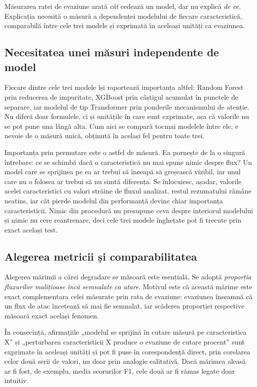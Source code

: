 Măsurarea ratei de evaziune arată \emph{cât} cedează un model, dar nu explică \emph{de ce}. Explicația necesită o măsură a dependenței modelului de fiecare caracteristică, comparabilă între cele trei modele și exprimată în aceleași unități ca evaziunea.

\subsection{Necesitatea unei măsuri independente de model}\label{subsec:agnostic}

Fiecare dintre cele trei modele își raportează importanța altfel: Random Forest prin reducerea de impuritate, XGBoost prin câștigul acumulat în punctele de separare, iar modelul de tip Transformer prin ponderile mecanismului de atenție. Nu diferă doar formulele, ci și unitățile în care sunt exprimate, așa că valorile nu se pot pune una lângă alta. Cum aici se compară tocmai modelele între ele, e nevoie de o măsură unică, obținută în același fel pentru toate trei.

Importanța prin permutare este o astfel de măsură. Ea pornește de la o singură întrebare: ce se schimbă dacă o caracteristică nu mai spune nimic despre flux? Un model care se sprijinea pe ea ar trebui să înceapă să greșească vizibil, iar unul care nu o folosea ar trebui să nu simtă diferența. Se înlocuiesc, așadar, valorile acelei caracteristici cu valori străine de fluxul analizat, restul rezumatului rămâne neatins, iar cât pierde modelul din performanță devine chiar importanța caracteristicii. Nimic din procedură nu presupune ceva despre interiorul modelului și nimic nu cere reantrenare, deci cele trei modele înghețate pot fi trecute prin exact același test.

\subsection{Alegerea metricii și comparabilitatea}\label{subsec:comensurabil}

Alegerea mărimii a cărei degradare se măsoară este esențială. Se adoptă \emph{proporția fluxurilor malițioase încă semnalate ca atare}. Motivul este că această mărime este exact complementara celei măsurate prin rata de evaziune: evaziunea înseamnă că un flux de atac încetează să mai fie semnalat, iar scăderea proporției respective măsoară exact același fenomen.

În consecință, afirmațiile „modelul se sprijină în cutare măsură pe caracteristica X” și „perturbarea caracteristicii X produce o evaziune de cutare procent” sunt exprimate în aceleași unități și pot fi puse în corespondență direct, prin corelarea celor două serii de valori, nu doar prin analogie calitativă. Dacă mărimea aleasă ar fi fost, de exemplu, media scorurilor F1, cele două ar fi rămas legate doar intuitiv.

